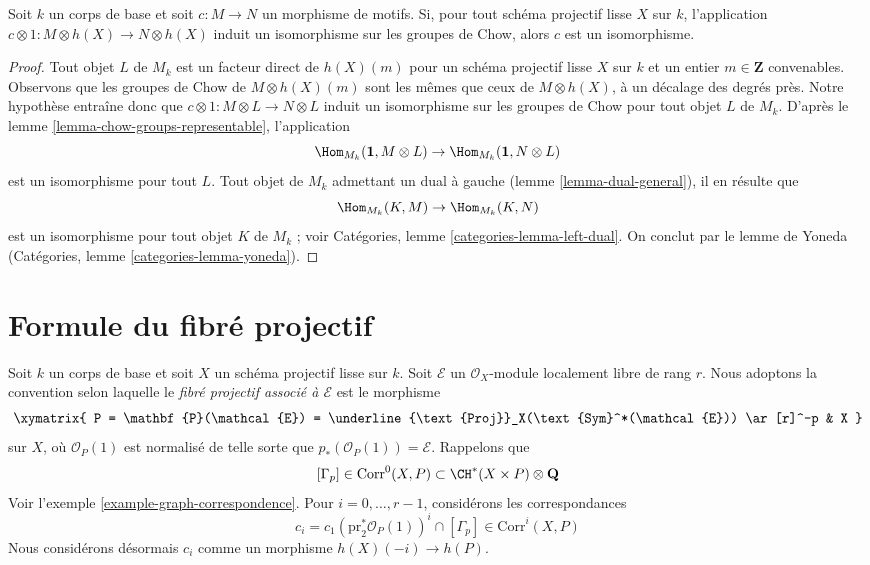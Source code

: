 \begin{lemma}[Manin]
\label{lemma-manin}
Soit $k$ un corps de base et soit $c : M \to N$ un morphisme de motifs.
Si, pour tout schéma projectif lisse $X$ sur $k$, l'application
$c \otimes 1 : M \otimes h(X) \to N \otimes h(X)$ induit un isomorphisme sur
les groupes de Chow, alors $c$ est un isomorphisme.
\end{lemma}

\begin{proof}
Tout objet $L$ de $M_k$ est un facteur direct de $h(X)(m)$ pour un schéma projectif lisse
$X$ sur $k$ et un entier $m \in \mathbf{Z}$ convenables. Observons que les groupes de Chow
de $M \otimes h(X)(m)$ sont les mêmes que ceux de $M \otimes h(X)$,
à un décalage des degrés près. Notre hypothèse entraîne donc
que $c \otimes 1 : M \otimes L \to N \otimes L$ induit un isomorphisme sur
les groupes de Chow pour tout objet $L$ de $M_k$. D'après le
lemme \ref{lemma-chow-groups-representable},
l'application
$$
\Hom_{M_k}(\mathbf{1}, M \otimes L) \to
\Hom_{M_k}(\mathbf{1}, N \otimes L)
$$
est un isomorphisme pour tout $L$. Tout objet de $M_k$ admettant un dual à gauche
(lemme \ref{lemma-dual-general}), il en résulte que
$$
\Hom_{M_k}(K, M) \to \Hom_{M_k}(K, N)
$$
est un isomorphisme pour tout objet $K$ de $M_k$ ; voir
Catégories, lemme \ref{categories-lemma-left-dual}.
On conclut par le lemme de Yoneda
(Catégories, lemme \ref{categories-lemma-yoneda}).
\end{proof}




\section{Formule du fibré projectif}
\label{section-projective-space-bundle}

\noindent
Soit $k$ un corps de base et soit $X$ un schéma projectif lisse sur $k$.
Soit $\mathcal{E}$ un $\mathcal{O}_X$-module localement libre de rang $r$.
Nous adoptons la convention selon laquelle le {\it fibré projectif associé à
$\mathcal{E}$} est le morphisme
$$
\xymatrix{
P = \mathbf{P}(\mathcal{E}) =
\underline{\text{Proj}}_X(\text{Sym}^*(\mathcal{E}))
\ar[r]^-p
& X
}
$$
sur $X$, où $\mathcal{O}_P(1)$ est normalisé de telle sorte que
$p_*(\mathcal{O}_P(1)) = \mathcal{E}$. Rappelons que
$$
[\Gamma_p] \in \text{Corr}^0(X, P) \subset \CH^*(X \times P) \otimes \mathbf{Q}
$$
Voir l'exemple \ref{example-graph-correspondence}.
Pour $i = 0, \ldots, r - 1$, considérons les correspondances
$$
c_i = c_1(\text{pr}_2^*\mathcal{O}_P(1))^i \cap [\Gamma_p]
\in \text{Corr}^i(X, P)
$$
Nous considérons désormais $c_i$ comme un morphisme $h(X)(-i) \to h(P)$.

